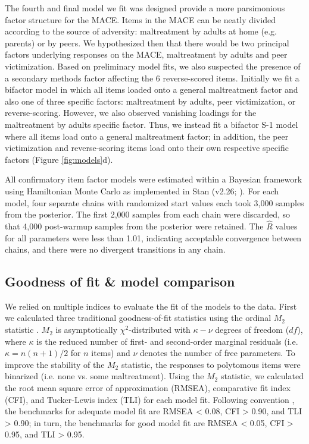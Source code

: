 \documentclass[letterpaper,man,natbib]{apa6}  %
\begin{document}
The fourth and final model we fit was designed provide a more parsimonious factor structure for the MACE. Items in the MACE can be neatly divided according to the source of adversity: maltreatment by adults at home (e.g. parents) or by peers. We hypothesized then that there would be two principal factors underlying responses on the MACE, maltreatment by adults and peer victimization. Based on preliminary model fits, we also suspected the presence of a secondary methods factor affecting the 6 reverse-scored items. Initially we fit a bifactor model in which all items loaded onto a general maltreatment factor and also one of three specific factors: maltreatment by adults, peer victimization, or reverse-scoring. However, we also observed vanishing loadings for the maltreatment by adults specific factor. Thus, we instead fit a bifactor S-1 model where all items load onto a general maltreatment factor; in addition, the peer victimization and reverse-scoring items load onto their own respective specific factors (Figure \ref{fig:models}d). 

All confirmatory item factor models were estimated within a Bayesian framework using Hamiltonian Monte Carlo as implemented in Stan (v2.26; \citealt{carpenter2017stan}). For each model, four separate chains with randomized start values each took 3,000 samples from the posterior. The first 2,000 samples from each chain were discarded, so that 4,000 post-warmup samples from the posterior were retained. The $\hat{R}$ values for all parameters were less than 1.01, indicating acceptable convergence between chains, and there were no divergent transitions in any chain. 

\subsection{Goodness of fit \& model comparison}

We relied on multiple indices to evaluate the fit of the models to the data. First we calculated three traditional goodness-of-fit statistics using the ordinal $M_2$ statistic \citep{cai2013limited, maydeu2013goodness}. $M_2$ is asymptotically $\chi^2$-distributed with $\kappa − \nu$ degrees of freedom ($df$), where $\kappa$ is the reduced number of first- and second-order marginal residuals (i.e. $\kappa = n(n + 1)/2$ for $n$ items) and $\nu$ denotes the number of free parameters. To improve the stability of the $M_2$ statistic, the responses to polytomous items were binarized (i.e. none vs. some maltreatment). Using the $M_2$ statistic, we calculated the root mean square error of approximation (RMSEA), comparative fit index (CFI), and Tucker-Lewis index (TLI) for each model fit. Following convention \citep{hu1999cutoff}, the benchmarks for adequate model fit are RMSEA < 0.08, CFI > 0.90, and TLI > 0.90; in turn, the benchmarks for good model fit are RMSEA < 0.05, CFI > 0.95, and TLI > 0.95. 
\end{document}
